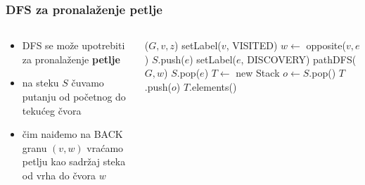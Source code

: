 \documentclass[compress,aspectratio=169]{beamer}
\begin{document}
\begin{frame}[fragile,shrink=3]
  \frametitle{DFS za pronalaženje petlje}
  {\footnotesize
  \begin{columns}
    \begin{column}[t]{8cm}
      \begin{itemize}
        \item DFS se može upotrebiti za pronalaženje \textbf{petlje} 
        \item na steku $S$ čuvamo putanju od početnog do tekućeg čvora
        \item čim naiđemo na {\scriptsize BACK} granu $(v,w)$ vraćamo
          petlju kao sadržaj steka od vrha do čvora $w$
      \end{itemize}
    \end{column}
    \begin{column}[t]{8cm}
      \begin{algorithmic}
        \STATE {}($G,v,z$)
        \STATE setLabel($v$, {\scriptsize VISITED})
            \STATE $w \leftarrow$ opposite($v,e$)
            \STATE $S$.push($e$)
              \STATE setLabel($e$, {\scriptsize DISCOVERY})
              \STATE pathDFS($G, w$)
              \STATE $S$.pop($e$)
            \ELSE
              \STATE $T \leftarrow$ new Stack
              \REPEAT
                \STATE $o \leftarrow S$.pop()
                \STATE $T$.push($o$)
              \RETURN $T$.elements()
            \ENDIF
          \ENDIF
        \ENDFOR
      \end{algorithmic}
    \end{column}
  \end{columns}
  }
\end{frame}
\end{document}
